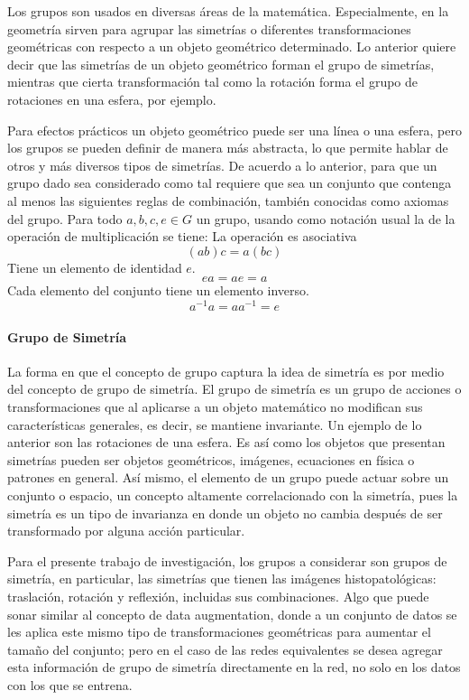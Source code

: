 \documentclass[12pt,letterpaper,final, openany]{scrbook}
\begin{document}
Los grupos son usados en diversas áreas de la matemática. Especialmente, en la geometría sirven para agrupar las simetrías o diferentes transformaciones geométricas con respecto a un objeto geométrico determinado. Lo anterior quiere decir que las simetrías de un objeto geométrico forman el grupo de simetrías, mientras que cierta transformación tal como la rotación forma el grupo de rotaciones en una esfera, por ejemplo.

Para efectos prácticos un objeto geométrico puede ser una línea o una esfera, pero los grupos se pueden definir de manera más abstracta, lo que permite hablar de otros y más diversos tipos de simetrías.
De acuerdo a lo anterior, para que un grupo dado sea considerado como tal requiere que sea un conjunto que contenga al menos las siguientes reglas de combinación, también conocidas como axiomas del grupo. Para todo $a,b,c,e \in G$ un grupo, usando como notación usual la de la operación de multiplicación se tiene:
La operación es asociativa
\begin{equation}
(ab)c=a(bc)
\end{equation}
Tiene un elemento de identidad $e$.
\begin{equation}
ea=ae=a
\end{equation}
Cada elemento del conjunto tiene un elemento inverso.
\begin{equation}
a^{-1}a=aa^{-1}=e
\end{equation}

\paragraph{Grupo de Simetría}

La forma en que el concepto de grupo captura la idea de simetría es por medio del concepto de grupo de simetría. El grupo de simetría es un grupo de acciones o transformaciones que al aplicarse a un objeto matemático no modifican sus características generales, es decir, se mantiene invariante. Un ejemplo de lo anterior son las rotaciones de una esfera. Es así como los objetos que presentan simetrías pueden ser objetos geométricos, imágenes, ecuaciones en física o patrones en general. Así mismo, el elemento de un grupo puede actuar sobre un conjunto o espacio, un concepto altamente correlacionado con la simetría, pues la simetría es un tipo de invarianza en donde un objeto no cambia después de ser transformado por alguna acción particular.

Para el presente trabajo de investigación, los grupos a considerar son grupos de simetría, en particular, las simetrías que tienen las imágenes histopatológicas: traslación, rotación y reflexión, incluidas sus combinaciones. Algo que puede sonar similar al concepto de data augmentation, donde a un conjunto de datos se les aplica este mismo tipo de transformaciones geométricas para aumentar el tamaño del conjunto; pero en el caso de las redes equivalentes se desea agregar esta información de grupo de simetría directamente en la red, no solo en los datos con los que se entrena.
\end{document}
